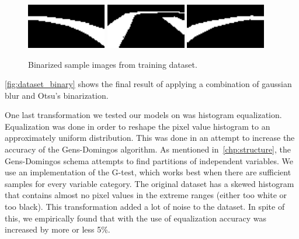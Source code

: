 \begin{figure}[h]
  \centering\includegraphics[width=0.31\textwidth]{imgs/binary_left.png}
  \includegraphics[width=0.31\textwidth]{imgs/binary_up.png}
  \includegraphics[width=0.31\textwidth]{imgs/binary_right.png}
  \caption{Binarized sample images from training dataset.\label{fig:dataset_binary}}
\end{figure}

\autoref{fig:dataset_binary} shows the final result of applying a combination of gaussian blur and
Otsu's binarization.

One last transformation we tested our models on was histogram equalization. Equalization was done
in order to reshape the pixel value histogram to an approximately uniform distribution. This was
done in an attempt to increase the accuracy of the Gens-Domingos algorithm. As mentioned
in~\autoref{chp:structure}, the Gens-Domingos schema attempts to find partitions of independent
variables. We use an implementation of the G-test, which works best when there are sufficient
samples for every variable category. The original dataset has a skewed histogram that contains
almost no pixel values in the extreme ranges (either too white or too black). This transformation
added a lot of noise to the dataset. In spite of this, we empirically found that with the use of
equalization accuracy was increased by more or less 5\%.

